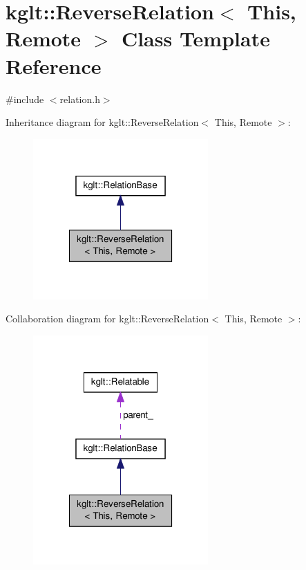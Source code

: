 \hypertarget{classkglt_1_1_reverse_relation}{\section{kglt\-:\-:Reverse\-Relation$<$ This, Remote $>$ Class Template Reference}
\label{classkglt_1_1_reverse_relation}
}


{\ttfamily \#include $<$relation.\-h$>$}



Inheritance diagram for kglt\-:\-:Reverse\-Relation$<$ This, Remote $>$\-:\nopagebreak
\begin{figure}[H]
\begin{center}
\leavevmode
\includegraphics[width=190pt]{classkglt_1_1_reverse_relation__inherit__graph}
\end{center}
\end{figure}


Collaboration diagram for kglt\-:\-:Reverse\-Relation$<$ This, Remote $>$\-:\nopagebreak
\begin{figure}[H]
\begin{center}
\leavevmode
\includegraphics[width=190pt]{classkglt_1_1_reverse_relation__coll__graph}
\end{center}
\end{figure}
